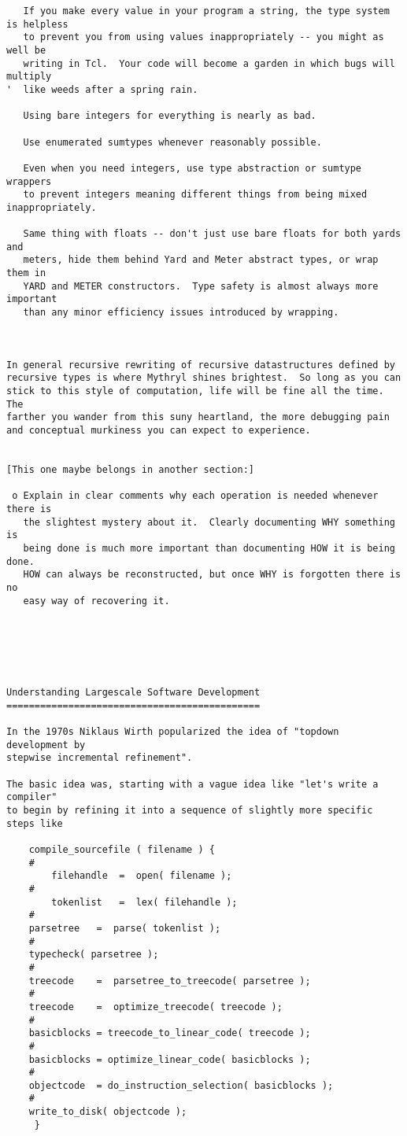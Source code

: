 \begin{verbatim}
   If you make every value in your program a string, the type system is helpless
   to prevent you from using values inappropriately -- you might as well be
   writing in Tcl.  Your code will become a garden in which bugs will multiply
'  like weeds after a spring rain.

   Using bare integers for everything is nearly as bad.

   Use enumerated sumtypes whenever reasonably possible.

   Even when you need integers, use type abstraction or sumtype wrappers
   to prevent integers meaning different things from being mixed inappropriately.  

   Same thing with floats -- don't just use bare floats for both yards and
   meters, hide them behind Yard and Meter abstract types, or wrap them in
   YARD and METER constructors.  Type safety is almost always more important
   than any minor efficiency issues introduced by wrapping.



In general recursive rewriting of recursive datastructures defined by
recursive types is where Mythryl shines brightest.  So long as you can
stick to this style of computation, life will be fine all the time. The
farther you wander from this suny heartland, the more debugging pain
and conceptual murkiness you can expect to experience.


[This one maybe belongs in another section:]

 o Explain in clear comments why each operation is needed whenever there is
   the slightest mystery about it.  Clearly documenting WHY something is
   being done is much more important than documenting HOW it is being done.
   HOW can always be reconstructed, but once WHY is forgotten there is no
   easy way of recovering it.






Understanding Largescale Software Development
=============================================

In the 1970s Niklaus Wirth popularized the idea of "topdown development by
stepwise incremental refinement".

The basic idea was, starting with a vague idea like "let's write a compiler"
to begin by refining it into a sequence of slightly more specific steps like

    compile_sourcefile ( filename ) {
	#
        filehandle  =  open( filename );
	#
        tokenlist   =  lex( filehandle );
	#
	parsetree   =  parse( tokenlist );
	#
	typecheck( parsetree );
	#
	treecode    =  parsetree_to_treecode( parsetree );
	#
	treecode    =  optimize_treecode( treecode );
	#
	basicblocks = treecode_to_linear_code( treecode );
	#
	basicblocks = optimize_linear_code( basicblocks );
	#
	objectcode  = do_instruction_selection( basicblocks );
	#
	write_to_disk( objectcode );
     }


\end{verbatim}
